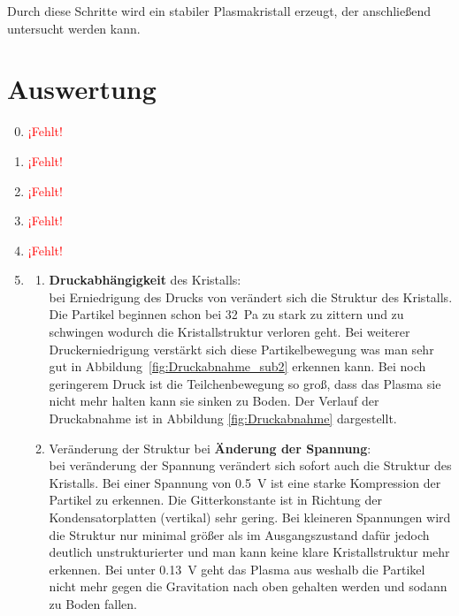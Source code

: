 \documentclass[12pt,a4paper,ngerman]{report}
\providecommand{\fehlt}{\textcolor{red}{{ ¡Fehlt! }}}
\begin{document}
Durch diese Schritte wird ein stabiler Plasmakristall erzeugt, der anschließend untersucht werden kann.	


\chapter{Auswertung}
	
	\begin{enumerate}[font=\bfseries]
		\setcounter{enumi}{-1}
		\item \fehlt
		\item \fehlt
		\item \fehlt
		\item \fehlt
		\item \fehlt
		\item \begin{enumerate}[font=\bfseries, label=\alph*)]
			\item \textbf{Druckabhängigkeit} des Kristalls: \\
			bei Erniedrigung des Drucks von verändert sich die Struktur des Kristalls. Die Partikel beginnen schon bei \qty{32}{\pascal} zu stark zu zittern und zu schwingen wodurch die Kristallstruktur verloren geht. Bei weiterer Druckerniedrigung verstärkt sich diese Partikelbewegung was man sehr gut in Abbildung~\ref{fig:Druckabnahme_sub2} erkennen kann. Bei noch geringerem Druck ist die Teilchenbewegung so groß, dass das Plasma sie nicht mehr halten kann sie sinken zu Boden. Der Verlauf der Druckabnahme ist in Abbildung \ref{fig:Druckabnahme} dargestellt. 
			
			\item Veränderung der Struktur bei \textbf{Änderung der Spannung}: \\
			bei veränderung der Spannung verändert sich sofort auch die Struktur des Kristalls. Bei einer Spannung von \qty{0,5}{\volt} ist eine starke Kompression der Partikel zu erkennen. Die Gitterkonstante ist in Richtung der Kondensatorplatten (vertikal) sehr gering. Bei kleineren Spannungen wird die Struktur nur minimal größer als im Ausgangszustand dafür jedoch deutlich unstrukturierter und man kann keine klare Kristallstruktur mehr erkennen. Bei unter \qty{0.13}{\volt} geht das Plasma aus weshalb die Partikel nicht mehr gegen die Gravitation nach oben gehalten werden und sodann zu Boden fallen. 
		\end{enumerate}
			
	\end{enumerate}
	
\end{document}
